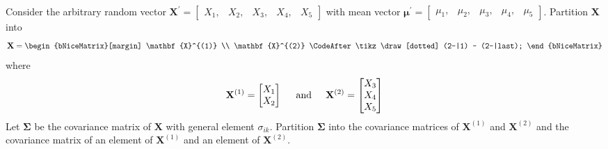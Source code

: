         Consider the arbitrary random vector $\mathbf{X}^\prime = \begin{bmatrix}
            X_1, & X_2, & X_3, & X_4, & X_5
        \end{bmatrix}$ with mean vector $\boldsymbol{\mu}^\prime = \begin{bmatrix}
            \mu_1, & \mu_2, & \mu_3, & \mu_4, & \mu_5
        \end{bmatrix}$. Partition $\mathbf{X}$ into
        \[
            \mathbf{X}
            =
            \begin{bNiceMatrix}[margin]
                \mathbf{X}^{(1)} \\
                \mathbf{X}^{(2)}
                \CodeAfter \tikz \draw[dotted] (2-|1) -- (2-|last);
            \end{bNiceMatrix}
        \]
        where
        \[
            \mathbf{X}^{(1)}
            =
            \begin{bmatrix}
                X_1 \\
                X_2
            \end{bmatrix}
            \hspace{0.2in}\text{and}\hspace{0.2in}
            \mathbf{X}^{(2)}
            =
            \begin{bmatrix}
                X_3 \\
                X_4 \\
                X_5
            \end{bmatrix}
        \]
        Let $\mathbf{\Sigma}$ be the covariance matrix of $\mathbf{X}$ with general element $\sigma_{ik}$. Partition $\mathbf{\Sigma}$ into the covariance matrices of $\mathbf{X}^{(1)}$ and $\mathbf{X}^{(2)}$ and the covariance matrix of an element of $\mathbf{X}^{(1)}$ and an element of $\mathbf{X}^{(2)}$.
